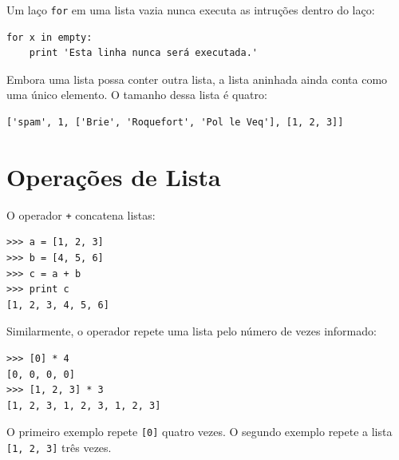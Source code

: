 

Um laço {\tt for} em uma lista vazia nunca executa as intruções dentro do laço:

\beforeverb
\begin{verbatim}
for x in empty:
    print 'Esta linha nunca será executada.'
\end{verbatim}
\afterverb
%
Embora uma lista possa conter outra lista, a lista aninhada ainda conta
como uma único elemento. O tamanho dessa lista é quatro:


\beforeverb
\begin{verbatim}
['spam', 1, ['Brie', 'Roquefort', 'Pol le Veq'], [1, 2, 3]]
\end{verbatim}
\afterverb



\section{Operações de Lista}

O operador {\tt +} concatena listas:


\beforeverb
\begin{verbatim}
>>> a = [1, 2, 3]
>>> b = [4, 5, 6]
>>> c = a + b
>>> print c
[1, 2, 3, 4, 5, 6]
\end{verbatim}
\afterverb
%
Similarmente, o operador{\tt *} repete uma lista pelo número de vezes informado:


\beforeverb
\begin{verbatim}
>>> [0] * 4
[0, 0, 0, 0]
>>> [1, 2, 3] * 3
[1, 2, 3, 1, 2, 3, 1, 2, 3]
\end{verbatim}
\afterverb
%
O primeiro exemplo repete {\tt [0]} quatro vezes. O segundo exemplo
repete a lista {\tt [1, 2, 3]} três vezes.


